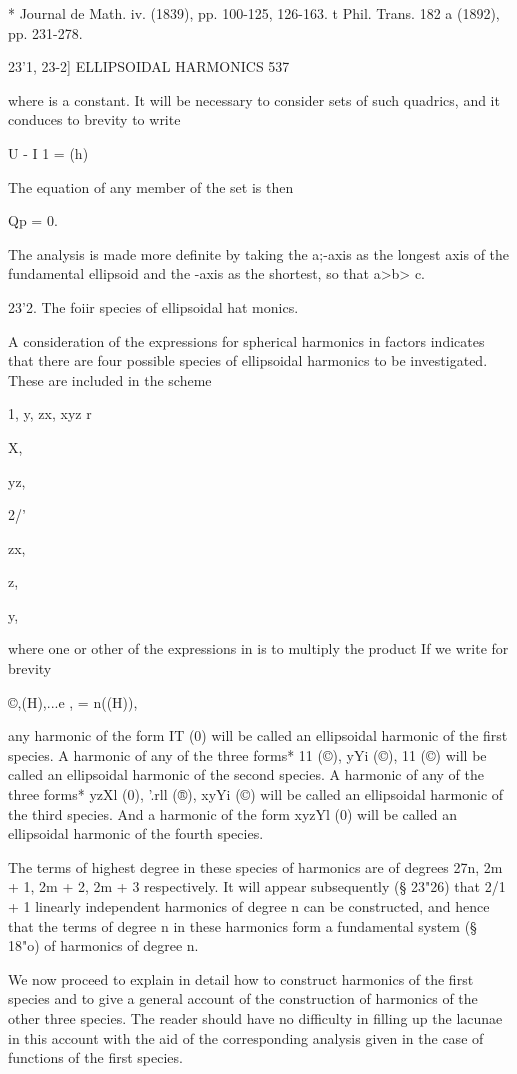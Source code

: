 * Journal de Math. iv. (1839), pp. 100-125, 126-163. t Phil. Trans.
182 a (1892), pp. 231-278.

23'1, 23-2] ELLIPSOIDAL HARMONICS 537

where is a constant. It will be necessary to consider sets of such
quadrics, and it conduces to brevity to write

U - I 1 = (h)

The equation of any member of the set is then

Qp = 0.

The analysis is made more definite by taking the a;-axis as the
longest axis of the fundamental ellipsoid and the -axis as the
shortest, so that a>b> c.

23'2. The foiir species of ellipsoidal hat monics.

A consideration of the expressions for spherical harmonics in factors
indicates that there are four possible species of ellipsoidal
harmonics to be investigated. These are included in the scheme

1, y, zx, xyz r%

X,

yz,

2/'

zx,

z,

 y,

where one or other of the expressions in is to multiply the product If
we write for brevity

©,(H),...e , = n((H)),

any harmonic of the form IT (0) will be called an ellipsoidal harmonic
of the first species. A harmonic of any of the three forms* 11 (©),
yYi (©), 11 (©) will be called an ellipsoidal harmonic of the second
species. A harmonic of any of the three forms* yzXl (0), '.rll (®),
xyYi (©) will be called an ellipsoidal harmonic of the third species.
And a harmonic of the form xyzYl (0) will be called an ellipsoidal
harmonic of the fourth species.

The terms of highest degree in these species of harmonics are of
degrees 27n, 2m + 1, 2m + 2, 2m + 3 respectively. It will appear
subsequently (§ 23"26) that 2/1 + 1 linearly independent harmonics of
degree n can be constructed, and hence that the terms of degree n in
these harmonics form a fundamental system (§ 18"o) of harmonics of
degree n.

We now proceed to explain in detail how to construct harmonics of the
first species and to give a general account of the construction of
harmonics of the other three species. The reader should have no
difficulty in filling up the lacunae in this account with the aid of
the corresponding analysis given in the case of functions of the first
species.

